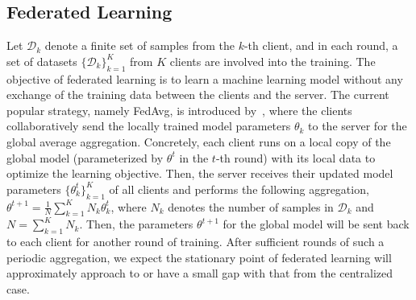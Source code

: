 \documentclass{article} %
\newcommand{\cD}{\mathcal{D}}
\theoremstyle{plain}
\theoremstyle{definition}
\theoremstyle{remark}
\begin{document}
\subsection{Federated Learning}
Let $\cD_{k}$ denote a finite set of samples from the $k$-th client, and in each round, a set of datasets $\{\cD_{k}\}_{k=1}^K$ from $K$ clients are involved into the training. The objective of federated learning is to learn a machine learning model without any exchange of the training data between the clients and the server. The current popular strategy, namely FedAvg, is introduced by~\citet{mcmahan2017communication}, where the clients collaboratively send the locally trained model parameters $\theta_{k}$ to the server for the global average aggregation. Concretely, each client runs on a local copy of the global model (parameterized by $\theta^t$ in the $t$-th round) with its local data to optimize the learning objective. Then, the server receives their updated model parameters $\{\theta^t_k\}_{k=1}^K$ of all clients and performs the following aggregation,
$\theta^{t+1} = \frac{1}{N}\sum^K_{k=1}{N_{k}\theta^{t}_{k}}$,
where $N_k$ denotes the number of samples in $\cD_k$ and $N=\sum_{k=1}^K N_k$. Then, the parameters $\theta^{t+1}$ for the global model will be sent back to each client for another round of training. After sufficient rounds of such a periodic aggregation, we expect the stationary point of federated learning will approximately approach to or have a small gap with that from the centralized case.




\end{document}
